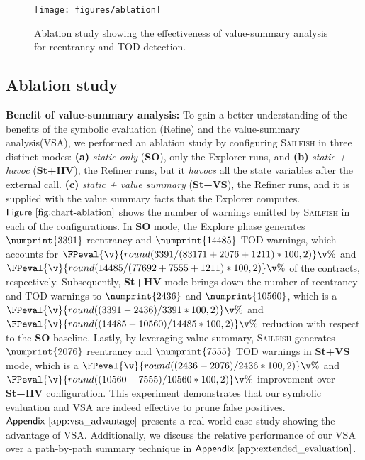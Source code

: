 \documentclass[conference, romanappendices]{tex/IEEEtran}
\theoremstyle{bfnote}
\newcommand{\toolname}{\textsc{Sailfish}\xspace}
\newcommand{\explore}{{\sc Explore}\xspace}
\newcommand{\explorer}{{\sc Explorer}\xspace}
\newcommand{\refine}{{\sc Refine}\xspace}
\newcommand{\refiner}{{\sc Refiner}\xspace}
\newcommand{\reentrancy}{{reentrancy}\xspace}
\newcommand{\vsa}{{value-summary analysis}\xspace}
\let\num\numprint
\newcommand{\Fig}[1]{\ensuremath{\sf Figure~\ref{#1}}}
\newcommand{\Appen}[1]{\ensuremath{\sf Appendix~\ref{#1}}}
\newcommand{\clintSafeDAO}{83171}
\newcommand{\clintUnsafeDAO}{2076}
\newcommand{\clintSafeTOD}{77692}
\newcommand{\clintUnsafeTOD}{7555}
\newcommand{\clintTimeout}{1211}
\newcommand{\clintStaticOnlyDAO}{3391}
\newcommand{\clintStaticOnlyTOD}{14485}
\newcommand{\clintHavocDAO}{2436}
\newcommand{\clintHavocTOD}{10560}
\begin{document}
\begin{figure}[!t]
	\vspace{-4mm}
	\centering
	\texttt{[image: figures/ablation]}
	\vspace{-3.5mm}
	\caption{\small Ablation study showing the effectiveness of \vsa for \reentrancy and TOD detection.
	}
	\label{fig:chart-ablation}
	\vspace{-7mm}
\end{figure}

\subsection{Ablation study}
\label{sec:ablation}
\noindent
\textbf{Benefit of \vsa:}
To gain a better understanding of the benefits of the symbolic evaluation (\refine) and the \vsa (VSA), we performed an ablation study by configuring \toolname{} in three distinct modes:
\textbf{(a)} \textit{static-only} (\textbf{SO}), only the \explorer runs, and \textbf{(b)} \textit{static + havoc} (\textbf{St+HV}), the \refiner{} runs, but it \textit{havocs} all the state variables after the external call. 
\textbf{(c)} \textit{static + value summary} (\textbf{St+VS}), the \refiner{} runs, and it is supplied with the value summary facts that the \explorer computes.
\Fig{fig:chart-ablation} shows the number of warnings emitted by \toolname{} in each of the configurations.
In \textbf{SO} mode, the \explore phase generates $\num{\clintStaticOnlyDAO}$ \reentrancy and $\num{\clintStaticOnlyTOD}$ {TOD\EndAccSupp{}} warnings, which accounts for $\FPeval{\v}{round(\clintStaticOnlyDAO/(\clintSafeDAO+\clintUnsafeDAO+\clintTimeout)*100,2)}\v\%$ and $\FPeval{\v}{round(\clintStaticOnlyTOD/(\clintSafeTOD+\clintUnsafeTOD+\clintTimeout)*100,2)}\v\%$ of the contracts, respectively.
Subsequently, \textbf{St+HV} mode brings down the number of \reentrancy and {TOD\EndAccSupp{}} warnings to $\num{\clintHavocDAO}$ and $\num{\clintHavocTOD}$, which is a $\FPeval{\v}{round((\clintStaticOnlyDAO-\clintHavocDAO)/\clintStaticOnlyDAO*100,2)}\v\%$ and $\FPeval{\v}{round((\clintStaticOnlyTOD-\clintHavocTOD)/\clintStaticOnlyTOD*100,2)}\v\%$ reduction with respect to the \textbf{SO} baseline. 
Lastly, by leveraging value summary, \toolname{} generates $\num{\clintUnsafeDAO}$ \reentrancy and $\num{\clintUnsafeTOD}$ {TOD\EndAccSupp{}} warnings in \textbf{St+VS} mode, which is a $\FPeval{\v}{round((\clintHavocDAO-\clintUnsafeDAO)/\clintHavocDAO*100,2)}\v\%$ and $\FPeval{\v}{round((\clintHavocTOD-\clintUnsafeTOD)/\clintHavocTOD*100,2)}\v\%$ improvement over \textbf{St+HV} configuration.
This experiment demonstrates that our symbolic evaluation and VSA are indeed effective to prune false positives.
\Appen{app:vsa_advantage} presents a real-world case study showing the advantage of VSA.
Additionally, we discuss the relative performance of our VSA over a path-by-path summary technique in \Appen{app:extended_evaluation}.
\end{document}
